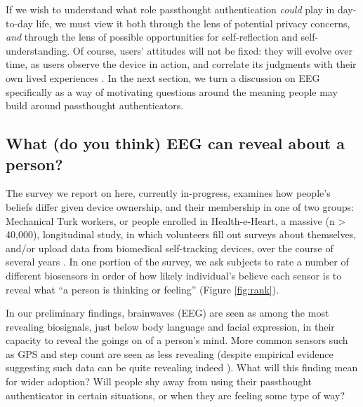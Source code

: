 \documentclass[sigconf]{acmart}
\begin{document}
If we wish to understand what role passthought authentication \emph{could} play in day-to-day life,
we must view it both through the lens of potential privacy concerns, \emph{and} through the lens of possible opportunities for self-reflection and self-understanding. 
Of course, users' attitudes will not be fixed: they will evolve over time, as users observe the device in action, and correlate its judgments with their own lived experiences \cite{Nafus2016}.
In the next section, we turn a discussion on EEG specifically as a way of motivating questions around the meaning people may build around passthought authenticators.


\subsection{What (do you think) EEG can reveal about a person?}
\label{sec:org1a9e970}

The survey we report on here, currently in-progress, examines how people's beliefs differ given device ownership, and their membership in one of two groups: Mechanical Turk workers, or people enrolled in Health-e-Heart, a massive (n > 40,000), longitudinal study, in which volunteers fill out surveys about themselves, and/or upload data from biomedical self-tracking devices, over the course of several years \cite{Estrin2010a}.
In one portion of the survey, we ask subjects to rate a number of different biosensors in order of how likely individual's believe each sensor is to reveal what ``a person is thinking or feeling'' (Figure \ref{fig:rank}).

In our preliminary findings, brainwaves (EEG) are seen as among the most revealing biosignals, just below body language and facial expression, in their capacity to reveal the goings on of a person's mind. 
More common sensors such as GPS and step count are seen as less revealing (despite empirical evidence suggesting such data can be quite revealing indeed \cite{Canzian2015}).
What will this finding mean for wider adoption? 
Will people shy away from using their passthought authenticator in certain situations, or when they are feeling some type of way?
\end{document}
